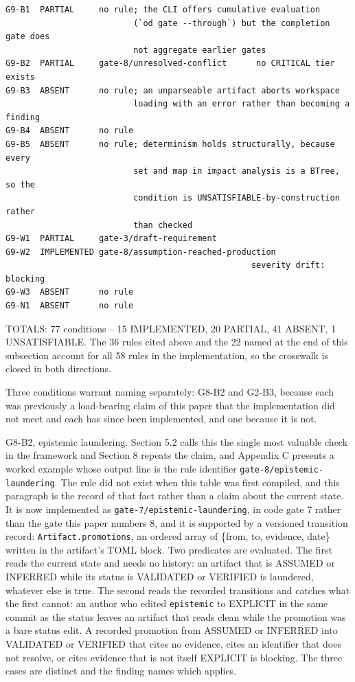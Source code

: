 \documentclass[11pt,a4paper]{article}
\begin{document}
\begin{Verbatim}[fontsize=\footnotesize,breaklines=true,breakanywhere=true,breakautoindent=false,samepage=false]
G9-B1  PARTIAL     no rule; the CLI offers cumulative evaluation
                          (`od gate --through`) but the completion gate does
                          not aggregate earlier gates
G9-B2  PARTIAL     gate-8/unresolved-conflict      no CRITICAL tier exists
G9-B3  ABSENT      no rule; an unparseable artifact aborts workspace
                          loading with an error rather than becoming a finding
G9-B4  ABSENT      no rule
G9-B5  ABSENT      no rule; determinism holds structurally, because every
                          set and map in impact analysis is a BTree, so the
                          condition is UNSATISFIABLE-by-construction rather
                          than checked
G9-W1  PARTIAL     gate-3/draft-requirement
G9-W2  IMPLEMENTED gate-8/assumption-reached-production
                                                  severity drift: blocking
G9-W3  ABSENT      no rule
G9-N1  ABSENT      no rule
\end{Verbatim}

TOTALS: 77 conditions -- 15 IMPLEMENTED, 20 PARTIAL, 41 ABSENT, 1 UNSATISFIABLE. The 36 rules cited above and the 22 named at the end of this subsection account for all 58 rules in the implementation, so the crosswalk is closed in both directions.

Three conditions warrant naming separately: G8-B2 and G2-B3, because each was previously a load-bearing claim of this paper that the implementation did not meet and each has since been implemented, and one because it is not.

G8-B2, epistemic laundering. Section 5.2 calls this the single most valuable check in the framework and Section 8 repeats the claim, and Appendix C presents a worked example whose output line is the rule identifier \texttt{gate-8/epistemic-laundering}. The rule did not exist when this table was first compiled, and this paragraph is the record of that fact rather than a claim about the current state. It is now implemented as \texttt{gate-7/epistemic-laundering}, in code gate 7 rather than the gate this paper numbers 8, and it is supported by a versioned transition record: \texttt{Artifact.promotions}, an ordered array of \{from, to, evidence, date\} written in the artifact's TOML block. Two predicates are evaluated. The first reads the current state and needs no history: an artifact that is ASSUMED or INFERRED while its status is VALIDATED or VERIFIED is laundered, whatever else is true. The second reads the recorded transitions and catches what the first cannot: an author who edited \texttt{epistemic} to EXPLICIT in the same commit as the status leaves an artifact that reads clean while the promotion was a bare status edit. A recorded promotion from ASSUMED or INFERRED into VALIDATED or VERIFIED that cites no evidence, cites an identifier that does not resolve, or cites evidence that is not itself EXPLICIT is blocking. The three cases are distinct and the finding names which applies.
\end{document}

